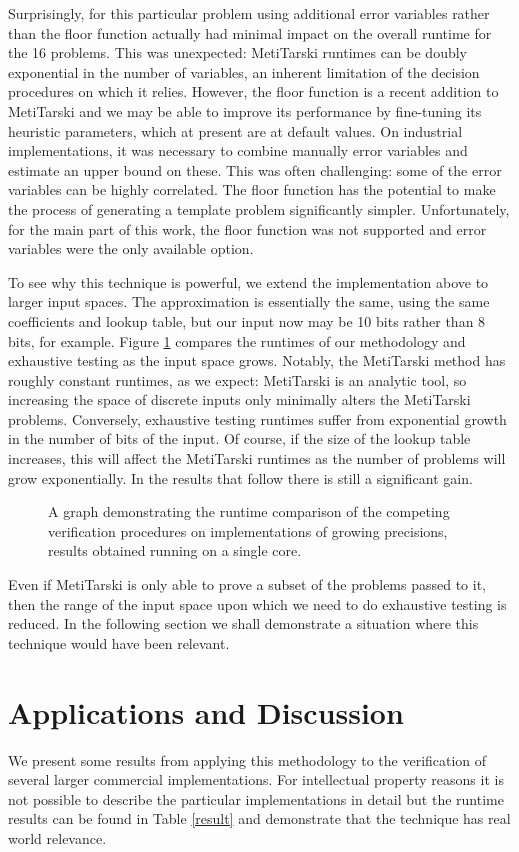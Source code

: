 \documentclass[a4]{article}
\begin{document}
Surprisingly, for this particular problem using additional error variables rather than the floor function actually had minimal impact on the overall runtime for the 16 problems. This was unexpected: MetiTarski runtimes can be doubly exponential in the number of variables, an inherent limitation of the decision procedures on which it relies. However, the floor function is a recent addition to MetiTarski and we may be able to improve its performance by fine-tuning its heuristic parameters, which at present are at default values. On industrial implementations, it was necessary to combine manually error variables and estimate an upper bound on these. This was often challenging: some of the error variables can be highly correlated. The floor function has the potential to make the process of generating a template problem significantly simpler. Unfortunately, for the main part of this work, the floor function was not supported and error variables were the only available option.

To see why this technique is powerful, we extend the implementation above to larger input spaces. The approximation is essentially the same, using the same coefficients and lookup table, but our input now may be 10 bits rather than 8 bits, for example. Figure \ref{runtime_graph} compares the runtimes of our methodology and exhaustive testing as the input space grows. Notably, the MetiTarski method has roughly constant runtimes, as we expect: MetiTarski is an analytic tool, so increasing the space of discrete inputs only minimally alters the MetiTarski problems. Conversely, exhaustive testing runtimes suffer from exponential growth in the number of bits of the input. Of course, if the size of the lookup table increases, this will affect the MetiTarski runtimes as the number of problems will grow exponentially. In the results that follow there is still a significant gain.
\begin{figure}
\centering

\caption{A graph demonstrating the runtime comparison of the competing verification procedures on implementations of growing precisions, results obtained running on a single core. \label{runtime_graph}
}
\end{figure}
Even if MetiTarski is only able to prove a subset of the problems passed to it, then the range of the input space upon which we need to do exhaustive testing is reduced. In the following section we shall demonstrate a situation where this technique would have been relevant. 

\section{Applications and Discussion}
We present some results from applying this methodology to the verification of several larger commercial implementations. For intellectual property reasons it is not possible to describe the particular implementations in detail but the runtime results can be found in Table \ref{result} and demonstrate that the technique has real world relevance. 
\end{document}
